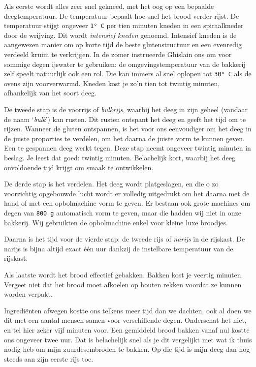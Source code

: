 \documentclass[
  11pt,
  dutch,
]{memoir}
\begin{document}
Als eerste wordt alles zeer snel gekneed, met het oog op een bepaalde
deegtemperatuur. De temperatuur bepaalt hoe snel het brood verder rijst.
De temperatuur stijgt ongeveer \texttt{1°\ C} per tien minuten kneden in
een spiraalkneder door de wrijving. Dit wordt \emph{intensief kneden}
genoemd. Intensief kneden is de aangewezen manier om op korte tijd de
beste glutenstructuur en een evenredig verdeeld kruim te verkrijgen. In
de zomer instrueerde Ghislain ons om voor sommige degen ijswater te
gebruiken: de omgevingstemperatuur van de bakkerij zelf speelt
natuurlijk ook een rol. Die kan immers al snel oplopen tot
\texttt{30°\ C} als de ovens zijn voorverwarmd. Kneden kost je zo'n tien
tot twintig minuten, afhankelijk van het soort deeg.

De tweede stap is de voorrijs of \emph{bulkrijs}, waarbij het deeg in
zijn geheel (vandaar de naam `\emph{bulk}') kan rusten. Dit rusten
ontspant het deeg en geeft het tijd om te rijzen. Wanneer de gluten
ontspannen, is het voor ons eenvoudiger om het deeg in de juiste
proporties te verdelen, om het daarna de juiste vorm te kunnen geven.
Een te gespannen deeg werkt tegen. Deze stap neemt ongeveer twintig
minuten in beslag. Je leest dat goed: twintig minuten. Belachelijk kort,
waarbij het deeg onvoldoende tijd krijgt om smaak te ontwikkelen.

De derde stap is het verdelen. Het deeg wordt platgeslagen, en die o zo
voorzichtig opgebouwde lucht wordt er volledig uitgedrukt om het daarna
met de hand of met een opbolmachine vorm te geven. Er bestaan ook grote
machines om degen van \texttt{800\ g} automatisch vorm te geven, maar
die hadden wij niet in onze bakkerij. Wij gebruikten de opbolmachine
enkel voor kleine luxe broodjes.

Daarna is het tijd voor de vierde stap: de tweede rijs of \emph{narijs}
in de rijskast. De narijs is bijna altijd exact één uur dankzij de
instelbare temperatuur van de rijskast.

Als laatste wordt het brood effectief gebakken. Bakken kost je veertig
minuten. Vergeet niet dat het brood moet afkoelen op houten rekken
voordat ze kunnen worden verpakt.

Ingrediënten afwegen kostte ons telkens meer tijd dan we dachten, ook al
doen we dit met een aantal mensen samen voor verschillende degen.
Onderschat het niet, en tel hier zeker vijf minuten voor. Een gemiddeld
brood bakken vanaf nul kostte ons ongeveer twee uur. Dat is belachelijk
snel als je dit vergelijkt met wat ik thuis nodig heb om mijn
zuurdesembroden te bakken. Op die tijd is mijn deeg dan nog steeds aan
zijn eerste rijs toe.
\end{document}
